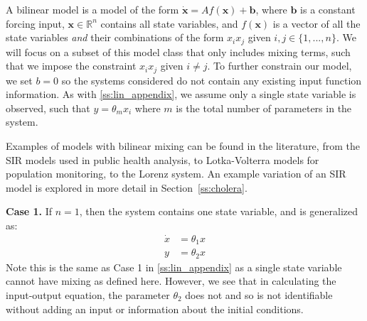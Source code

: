 \documentclass[a4paper,fleqn]{cas-dc}
\theoremstyle{definition}
\begin{document}
A bilinear model is a model of the form $\dot{\pmb{x}} = A f(\pmb{x}) + \pmb{b}$, where $\pmb{b}$ is a constant forcing input, $\pmb{x} \in \mathbb{R}^n$ contains all state variables, and $f(\pmb{x})$ is a vector of all the state variables \textit{and} their combinations of the form $x_i x_j$ given $i,j \in \{1, ...,n\}$.
We will focus on a subset of this model class that only includes mixing terms, such that we impose the constraint $x_i x_j$ given $i \neq j$.
To further constrain our model, we set $b = 0$ so the systems considered do not contain any existing input function information.
As with \cref{ss:lin_appendix}, we assume only a single state variable is observed, such that $y = \theta_{m} x_i$ where $m$ is the total number of parameters in the system.


Examples of models with bilinear mixing can be found in the literature, from the SIR models used in public health analysis, to Lotka-Volterra models for population monitoring, to the Lorenz system. 
An example variation of an SIR model is explored in more detail in Section~\ref{ss:cholera}.


\vspace{0.2cm}
\noindent \textbf{Case 1.}
If $n=1$, then the system contains one state variable, and is generalized as:
\begin{align*}
    \dot{x} &= \theta_1 x\\ \nonumber
    y & = \theta_2 x
\end{align*}
Note this is the same as Case 1 in \cref{ss:lin_appendix} as a single state variable cannot have mixing as defined here. However, we see that in calculating the input-output equation, the parameter $\theta_2$ does not and so is not identifiable without adding an input or information about the initial conditions.
\end{document}
